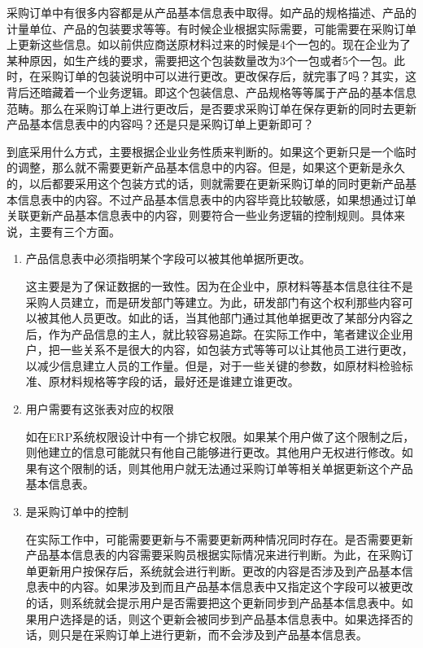     采购订单中有很多内容都是从产品基本信息表中取得。如产品的规格描述、产品的计量单位、产品的包装要求等等。有时候企业根据实际需要，可能需要在采购订单上更新这些信息。如以前供应商送原材料过来的时候是4个一包的。现在企业为了某种原因，如生产线的要求，需要把这个包装数量改为3个一包或者5个一包。此时，在采购订单的包装说明中可以进行更改。更改保存后，就完事了吗？其实，这背后还暗藏着一个业务逻辑。即这个包装信息、产品规格等等属于产品的基本信息范畴。那么在采购订单上进行更改后，是否要求采购订单在保存更新的同时去更新产品基本信息表中的内容吗？还是只是采购订单上更新即可？

    到底采用什么方式，主要根据企业业务性质来判断的。如果这个更新只是一个临时的调整，那么就不需要更新产品基本信息中的内容。但是，如果这个更新是永久的，以后都要采用这个包装方式的话，则就需要在更新采购订单的同时更新产品基本信息表中的内容。不过产品基本信息表中的内容毕竟比较敏感，如果想通过订单关联更新产品基本信息表中的内容，则要符合一些业务逻辑的控制规则。具体来说，主要有三个方面。

    \begin{enumerate}
        \item  产品信息表中必须指明某个字段可以被其他单据所更改。

        这主要是为了保证数据的一致性。因为在企业中，原材料等基本信息往往不是采购人员建立，而是研发部门等建立。为此，研发部门有这个权利那些内容可以被其他人员更改。如此的话，当其他部门通过其他单据更改了某部分内容之后，作为产品信息的主人，就比较容易追踪。在实际工作中，笔者建议企业用户，把一些关系不是很大的内容，如包装方式等等可以让其他员工进行更改，以减少信息建立人员的工作量。但是，对于一些关键的参数，如原材料检验标准、原材料规格等字段的话，最好还是谁建立谁更改。

        \item  用户需要有这张表对应的权限

        如在ERP系统权限设计中有一个排它权限。如果某个用户做了这个限制之后，则他建立的信息可能就只有他自己能够进行更改。其他用户无权进行修改。如果有这个限制的话，则其他用户就无法通过采购订单等相关单据更新这个产品基本信息表。

        \item  是采购订单中的控制

        在实际工作中，可能需要更新与不需要更新两种情况同时存在。是否需要更新产品基本信息表的内容需要采购员根据实际情况来进行判断。为此，在采购订单更新用户按保存后，系统就会进行判断。更改的内容是否涉及到产品基本信息表中的内容。如果涉及到而且产品基本信息表中又指定这个字段可以被更改的话，则系统就会提示用户是否需要把这个更新同步到产品基本信息表中。如果用户选择是的话，则这个更新会被同步到产品基本信息表中。如果选择否的话，则只是在采购订单上进行更新，而不会涉及到产品基本信息表。
    \end{enumerate}

